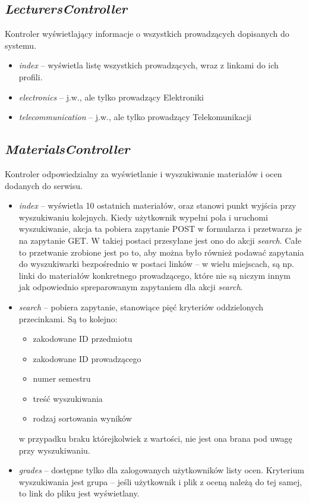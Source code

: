 \documentclass[a4paper,12pt,oneside]{report}
\begin{document}
\subsection{\emph{LecturersController}}
\label{con:lecturers}
  Kontroler wyświetlający informacje o wszystkich prowadzących dopisanych do systemu.
\begin{itemize}
  \item \emph{index} -- wyświetla listę wszystkich prowadzących, wraz z linkami do ich profili.
  \item \emph{electronics} -- j.w., ale tylko prowadzący Elektroniki
  \item \emph{telecommunication} -- j.w., ale tylko prowadzący Telekomunikacji
\end{itemize}

\subsection{\emph{MaterialsController}}
\label{con:materials}
  Kontroler odpowiedzialny za wyświetlanie i wyszukiwanie materiałów i ocen dodanych do serwisu.
\begin{itemize}
  \item \emph{index} -- wyświetla 10 ostatnich materiałów, oraz stanowi punkt wyjścia przy wyszukiwaniu kolejnych. Kiedy użytkownik wypełni pola i uruchomi wyszukiwanie, akcja ta pobiera zapytanie POST w formularza i przetwarza je na zapytanie GET. W takiej postaci przesyłane jest ono do akcji \emph{search}. Całe to przetwanie zrobione jest po to, aby można było również podawać zapytania do wyszukiwarki bezpośrednio w postaci linków -- w wielu miejscach, są np. linki do materiałów konkretnego prowadzącego, które nie są niczym innym jak odpowiednio spreparowanym zapytaniem dla akcji \emph{search}.
  \item \emph{search} -- pobiera zapytanie, stanowiące pięć kryteriów oddzielonych przecinkami. Są to kolejno:
  \begin{itemize}
    \item zakodowane ID przedmiotu
    \item zakodowane ID prowadzącego
    \item numer semestru
    \item treść wyszukiwania
    \item rodzaj sortowania wyników
  \end{itemize}
  w przypadku braku którejkolwiek z wartości, nie jest ona brana pod uwagę przy wyszukiwaniu.
  \item \emph{grades} -- dostępne tylko dla zalogowanych użytkowników listy ocen. Kryterium wyszukiwania jest grupa -- jeśli użytkownik i plik z oceną należą do tej samej, to link do pliku jest wyświetlany.
\end{itemize}
\end{document}
